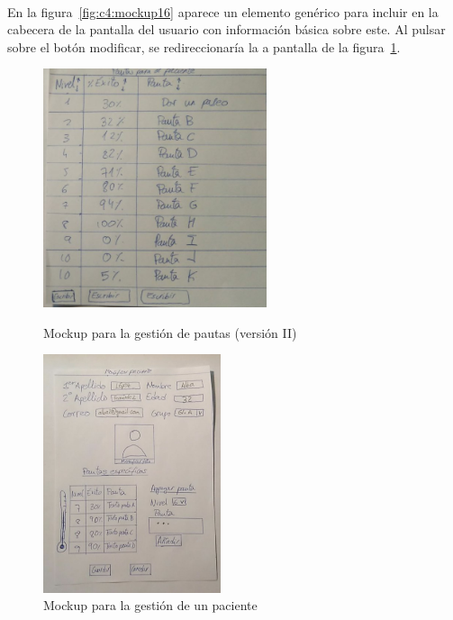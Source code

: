 \paragraph{}
En la figura~\ref{fig:c4:mockup16} aparece un elemento genérico para incluir en la cabecera de la pantalla del usuario con información básica sobre este. Al pulsar sobre el botón modificar, se redireccionaría la a pantalla de la figura~\ref{fig:c4:mockup12}.

\begin{figure}[h]
    \centering
    \begin{minipage}{.45\textwidth}
        \centering
        \includegraphics[width=0.8\linewidth, height=7cm]{Imagenes/anxA5-2.png}
        \caption[Mockup para la gestión de pautas (versión II)]{Mockup para la gestión de pautas (versión II)}
        \label{fig:c4:mockup11}
    \end{minipage}
    \hfill\vline\hfill
    \begin{minipage}{.45\textwidth}
        \centering
        \includegraphics[width=0.8\linewidth, height=7cm]{Imagenes/anxA6.jpg}
        \caption[Mockup para la gestión de un paciente]{Mockup para la gestión de un paciente}
        \label{fig:c4:mockup12}
    \end{minipage}
\end{figure}

